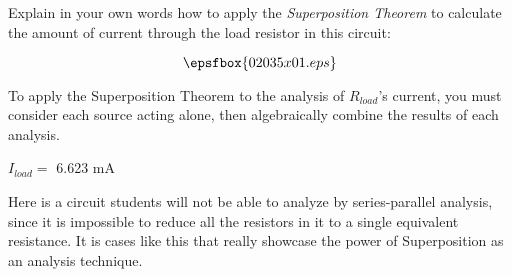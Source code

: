 

Explain in your own words how to apply the {\it Superposition Theorem} to calculate the amount of current through the load resistor in this circuit:

$$\epsfbox{02035x01.eps}$$







To apply the Superposition Theorem to the analysis of $R_{load}$'s current, you must consider each source acting alone, then algebraically combine the results of each analysis.

\vskip 10pt

$I_{load} = $ 6.623 mA 







Here is a circuit students will not be able to analyze by series-parallel analysis, since it is impossible to reduce all the resistors in it to a single equivalent resistance.  It is cases like this that really showcase the power of Superposition as an analysis technique.




